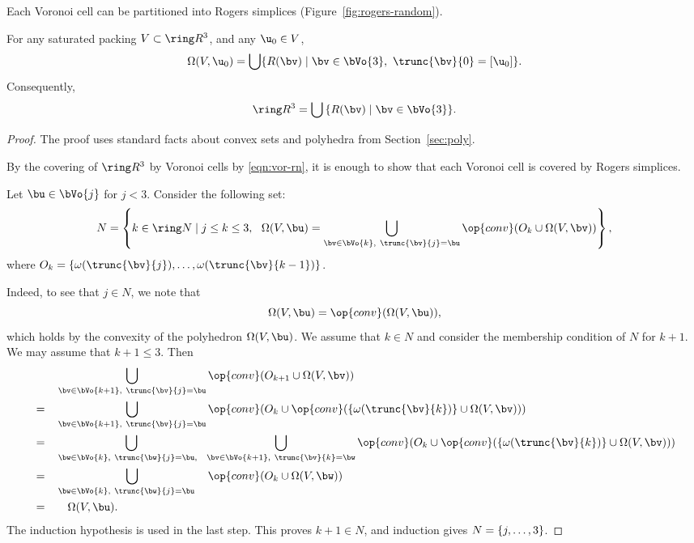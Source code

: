 \begin{cnl}
Each Voronoi cell can be partitioned into Rogers simplices (Figure~\ref{fig:rogers-random}).

\figBUGZBTW %


\begin{lemma}
\label{lemma:Rogers-d}
For any saturated packing $V\subset\vecR{3}$, and any $\u_0\in V$,
\begin{equation} 
\Omega(V,\u_0) = \bigcup \setcomp{ R(\bv) }{ \bv\in \bVo{3},~\trunc{\bv}{0} =[\u_0]}.
\end{equation}
Consequently,
\[ 
\vecR{3} = \bigcup\, \setcomp{ R(\bv) }{ \bv\in\bVo{3}}.
\] 
\end{lemma}


\begin{proof} 
The proof uses standard facts about convex sets and polyhedra from
Section~\ref{sec:poly}.

By the covering of $\vecR{3}$  by Voronoi cells by \eqref{eqn:vor-rn},
it is enough to show that each Voronoi cell is covered by Rogers
simplices.

Let $\bu\in \bVo{j}$ for $j<3$.
Consider the following set:
\[  
N = \left\{k\in\Nat\mid j\le k\le 3, ~~\Omega(V,\bu) 
= \bigcup_{\bv \in \bVo{k},~\trunc{\bv}{j}=\bu}
\op{conv}(O_k \cup\Omega(V,\bv)) 
\right\},
\] 
where $O_k = \{\omega(\trunc{\bv}{j}),\ldots,\omega(\trunc{\bv}{k-1})\}$.

  Indeed, to see that $j\in N$, we note that
\[  
\Omega(V,\bu) = \op{conv}(\Omega(V,\bu)),
\] 
which holds by the convexity of the polyhedron $\Omega(V,\bu)$.  We
assume that $k\in N$ and consider the membership condition of $N$ for
$k+1$.  We may assume that $k+1\le 3$.  Then
\begin{alignat*}{4}
&\phantom{=}&&\bigcup _{\bv \in \bVo{k+1},~\trunc{\bv}{j}=\bu}
\op{conv}(O_{k+1} \cup\Omega(V,\bv))
\vspace{6pt}\\
&=&&\bigcup _{\bv \in \bVo{k+1},~\trunc{\bv}{j}=\bu}
\op{conv}(O_{k} \cup\op{conv}(\braced{\omega(\trunc{\bv}{k})}
\cup\Omega(V,\bv)))
\vspace{6pt}\\
&=&&\bigcup _{\bw\in \bVo{k},~\trunc{\bw}{j}=\bu,~~}
\bigcup_{\bv \in \bVo{k+1},~\trunc{\bv}{k}=\bw}
\op{conv}(O_{k} \cup\op{conv}(\braced{\omega(\trunc{\bv}{k})}
\cup\Omega(V,\bv)))
\vspace{6pt}\\
&=&&\bigcup _{\bw\in \bVo{k},~\trunc{\bw}{j}=\bu\phantom{+1}}
\op{conv}(O_{k} \cup \Omega(V,\bw)    )
\vspace{6pt}\\
&=&&\quad\Omega(V,\bu).
\end{alignat*}
The induction hypothesis is used in the last step.  
This proves $k+1\in N$, and induction gives $N=\{j,\ldots,3\}$.


\end{proof}
\end{cnl}
